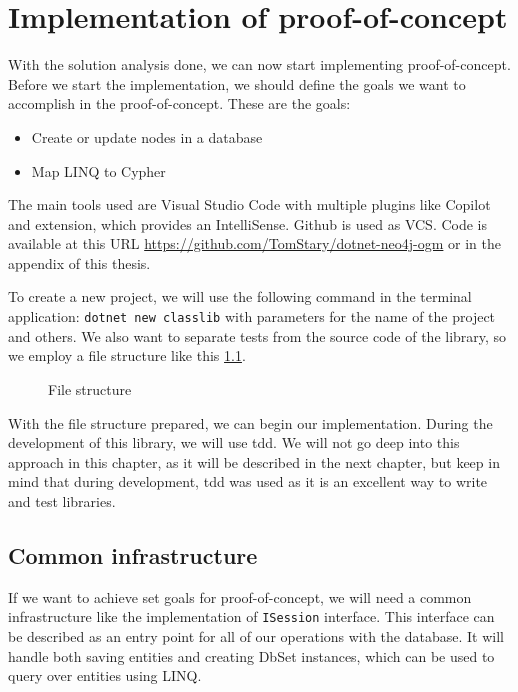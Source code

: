 \chapter {Implementation of proof-of-concept}

With the solution analysis done, we can now start implementing proof-of-concept.
Before we start the implementation, we should define the goals we want to accomplish in the proof-of-concept.
These are the goals:
\begin{itemize}
    \item {Create or update nodes in a database}
    \item {Map LINQ to Cypher}
\end{itemize}

The main tools used are Visual Studio Code with multiple plugins like Copilot and \CS extension, which provides an IntelliSense.
Github is used as VCS. Code is available at this URL \url{https://github.com/TomStary/dotnet-neo4j-ogm} or in the appendix of this thesis.

To create a new project, we will use the following command in the terminal application: \texttt{dotnet new classlib} with parameters for the name of the project and others.
We also want to separate tests from the source code of the library, so we employ a file structure like this \ref{ref:fileStructure}.

\begin{figure}[H]
    \caption{File structure}
    \label{ref:fileStructure}
\end{figure}

With the file structure prepared, we can begin our implementation. During the development of this
library, we will use \acrfull{tdd}. We will not go deep into this approach in this chapter,
as it will be described in the next chapter, but keep in mind that during development, \acrshort{tdd} was used as it is an excellent way to write and test libraries.

\section {Common infrastructure}

If we want to achieve set goals for proof-of-concept, we will need a common infrastructure like the implementation of \texttt{ISession} interface.
This interface can be described as an entry point for all of our operations with the database. It will handle both saving entities and creating DbSet
instances, which can be used to query over entities using LINQ.

